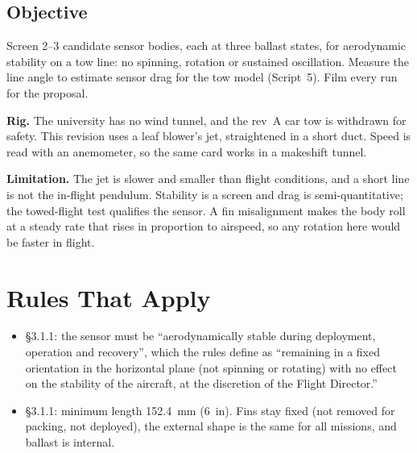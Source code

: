 \documentclass[final]{dbfdoc}
\begin{document}
\begin{frontmatter}
\section{Objective}
\noindent\begin{minipage}[t]{0.62\textwidth}
\setlength\parindent{1.15em}\noindent
Screen 2--3 candidate sensor bodies, each at three ballast states, for aerodynamic stability on a tow line: no spinning, rotation or sustained oscillation. Measure the line angle to estimate sensor drag for the tow model (Script~5). Film every run for the proposal.

\noindent\textbf{Rig.} The university has no wind tunnel, and the rev~A car tow is withdrawn for safety. This revision uses a leaf blower's jet, straightened in a short duct. Speed is read with an anemometer, so the same card works in a makeshift tunnel.

\noindent\textbf{Limitation.} The jet is slower and smaller than flight conditions, and a short line is not the in-flight pendulum. Stability is a screen and drag is semi-quantitative; the towed-flight test qualifies the sensor. A fin misalignment makes the body roll at a steady rate that rises in proportion to airspeed, so any rotation here would be faster in flight.
\end{minipage}\hfill
\begin{minipage}[t]{0.35\textwidth}
\vspace{-11pt}
\begin{dbfpanel}
\hfill{}\dbfreadoutgap
{}\hfill{}\dbfreadoutgap
{}\hfill{}
\end{dbfpanel}
\end{minipage}
\end{frontmatter}

\section{Rules That Apply}
\begin{itemize}
\item §3.1.1: the sensor must be ``aerodynamically stable during deployment, operation and recovery'', which the rules define as ``remaining in a fixed orientation in the horizontal plane (not spinning or rotating) with no effect on the stability of the aircraft, at the discretion of the Flight Director.''
\item §3.1.1: minimum length 152.4~mm (6~in). Fins stay fixed (not removed for packing, not deployed), the external shape is the same for all missions, and ballast is internal.
\end{itemize}
\end{document}
